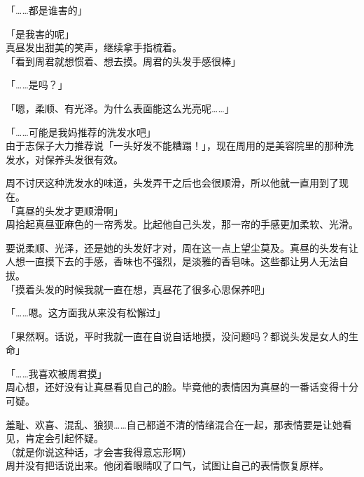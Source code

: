 「……都是谁害的」

「是我害的呢」\\

真昼发出甜美的笑声，继续拿手指梳着。\\

「看到周君就想惯着、想去摸。周君的头发手感很棒」

「……是吗？」

「嗯，柔顺、有光泽。为什么表面能这么光亮呢……」

「……可能是我妈推荐的洗发水吧」\\

由于志保子大力推荐说「一头好发不能糟蹋！」，现在周用的是美容院里的那种洗发水，对保养头发很有效。

周不讨厌这种洗发水的味道，头发弄干之后也会很顺滑，所以他就一直用到了现在。\\

「真昼的头发才更顺滑啊」\\

周拾起真昼亚麻色的一帘秀发。比起他自己头发，那一帘的手感更加柔软、光滑。

要说柔顺、光泽，还是她的头发好才对，周在这一点上望尘莫及。真昼的头发有让人想一直摸下去的手感，香味也不强烈，是淡雅的香皂味。这些都让男人无法自拔。\\

「摸着头发的时候我就一直在想，真昼花了很多心思保养吧」

「……嗯。这方面我从来没有松懈过」

「果然啊。话说，平时我就一直在自说自话地摸，没问题吗？都说头发是女人的生命」

「……我喜欢被周君摸」\\

周心想，还好没有让真昼看见自己的脸。毕竟他的表情因为真昼的一番话变得十分可疑。

羞耻、欢喜、混乱、狼狈……自己都道不清的情绪混合在一起，那表情要是让她看见，肯定会引起怀疑。\\

（就是你说这种话，才会害我得意忘形啊）\\

周并没有把话说出来。他闭着眼睛叹了口气，试图让自己的表情恢复原样。
